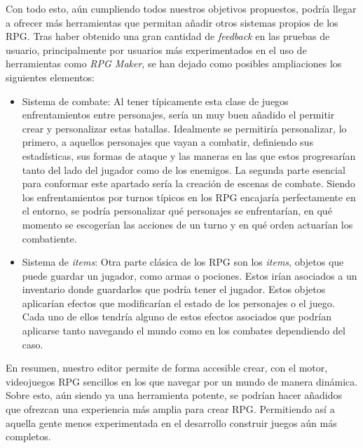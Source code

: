 Con todo esto, aún cumpliendo todos nuestros objetivos propuestos, \baker{} podría llegar a ofrecer más herramientas que permitan añadir otros sistemas propios de los RPG. Tras haber obtenido una gran cantidad de \textit{feedback} en las pruebas de usuario, principalmente por usuarios más experimentados en el uso de herramientas como \textit{RPG Maker}, se han dejado como posibles ampliaciones los siguientes elementos:
\begin{itemize}
	\item Sistema de combate: Al tener típicamente esta clase de juegos enfrentamientos entre personajes, sería un muy buen añadido el permitir crear y personalizar estas batallas. Idealmente se permitiría personalizar, lo primero, a aquellos personajes que vayan a combatir, definiendo sus estadísticas, sus formas de ataque y las maneras en las que estos progresarían tanto del lado del jugador como de los enemigos. La segunda parte esencial para conformar este apartado sería la creación de escenas de combate. Siendo los enfrentamientos por turnos típicos en los RPG encajaría perfectamente en el entorno, se podría personalizar qué personajes se enfrentarían, en qué momento se escogerían las acciones de un turno y en qué orden actuarían los combatiente.
	\item Sistema de \textit{items}: Otra parte clásica de los RPG son los \textit{items}, objetos que puede guardar un jugador, como armas o pociones. Estos irían asociados a un inventario donde guardarlos que podría tener el jugador. Estos objetos aplicarían efectos que modificarían el estado de los personajes o el juego. Cada uno de ellos tendría alguno de estos efectos asociados que podrían aplicarse tanto navegando el mundo como en los combates dependiendo del caso.
\end{itemize}

\medskip 

En resumen, nuestro editor permite de forma accesible crear, con el motor, videojuegos RPG sencillos en los que navegar por un mundo de manera dinámica. Sobre esto, aún siendo ya una herramienta potente, se podrían hacer añadidos que ofrezcan una experiencia más amplia para crear RPG. Permitiendo así a aquella gente menos experimentada en el desarrollo construir juegos aún más completos.